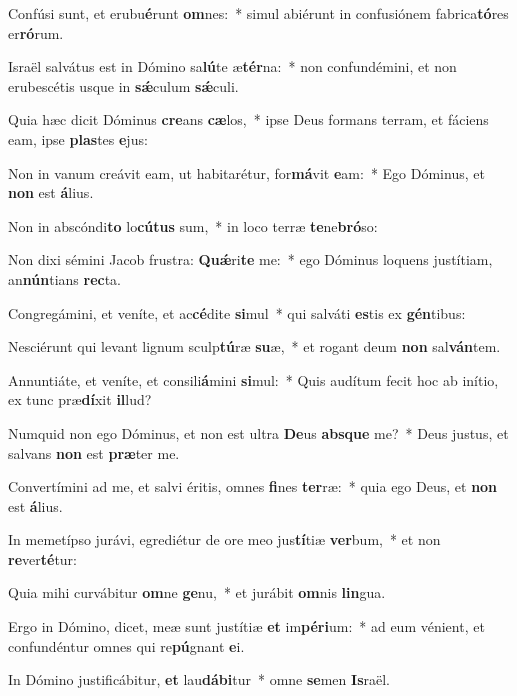 \item Confúsi sunt, et erubu\textbf{é}runt \textbf{om}nes:~* simul abiérunt in confusiónem fabrica\textbf{tó}res er\textbf{ró}rum.
\item Israël salvátus est in Dómino sa\textbf{lú}te æ\textbf{tér}na:~* non confundémini, et non erubescétis usque in \textbf{sǽ}culum \textbf{sǽ}culi.
\item Quia hæc dicit Dóminus \textbf{cre}ans \textbf{cæ}los,~* ipse Deus formans terram, et fáciens eam, ipse \textbf{plas}tes \textbf{e}jus:
\item Non in vanum creávit eam, ut habitarétur, for\textbf{má}vit \textbf{e}am:~* Ego Dóminus, et \textbf{non} est \textbf{á}lius.
\item Non in abscóndi\textbf{to} lo\textbf{cú}\textbf{tus} sum,~* in loco terræ \textbf{te}ne\textbf{bró}so:
\item Non dixi sémini Jacob frustra: \textbf{Quǽ}ri\textbf{te} me:~* ego Dóminus loquens justítiam, an\textbf{nún}tians \textbf{rec}ta.
\item Congregámini, et veníte, et ac\textbf{cé}dite \textbf{si}mul~* qui salváti \textbf{es}tis ex \textbf{gén}tibus:
\item Nesciérunt qui levant lignum sculp\textbf{tú}ræ \textbf{su}æ,~* et rogant deum \textbf{non} sal\textbf{ván}tem.
\item Annuntiáte, et veníte, et consili\textbf{á}mini \textbf{si}mul:~* Quis audítum fecit hoc ab inítio, ex tunc præ\textbf{dí}xit \textbf{il}lud?
\item Numquid non ego Dóminus, et non est ultra \textbf{De}us \textbf{abs}\textbf{que} me?~* Deus justus, et salvans \textbf{non} est \textbf{præ}ter me.
\item Convertímini ad me, et salvi éritis, omnes \textbf{fi}nes \textbf{ter}ræ:~* quia ego Deus, et \textbf{non} est \textbf{á}lius.
\item In memetípso jurávi, egrediétur de ore meo jus\textbf{tí}tiæ \textbf{ver}bum,~* et non \textbf{re}ver\textbf{té}tur:
\item Quia mihi curvábitur \textbf{om}ne \textbf{ge}nu,~* et jurábit \textbf{om}nis \textbf{lin}gua.
\item Ergo in Dómino, dicet, meæ sunt justítiæ \textbf{et} im\textbf{pé}\textbf{ri}um:~* ad eum vénient, et confundéntur omnes qui re\textbf{pú}gnant \textbf{e}i.
\item In Dómino justificábitur, \textbf{et} lau\textbf{dá}\textbf{bi}tur~* omne \textbf{se}men \textbf{Is}raël.
